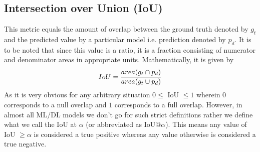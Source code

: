 \subsection{Intersection over Union (IoU)}
This metric equals the amount of overlap between the ground truth
denoted by $g_t$ and the predicted value by a particular model i.e.
prediction denoted by $p_d$. It is to be noted that since this value
is a ratio, it is a fraction consisting of numerator and denominator
areas in appropriate units. Mathematically, it is given by
\begin{equation}
  \centering
  IoU = \frac{area({g_{t}}\cap{ p_{d }})}{area({g_{t}}\cup{ p_{d }})}
\end{equation}
As it is very obvious for any arbitrary situation $0 \leqslant $ IoU
$\leqslant 1$ wherein $0$ corresponds to a null overlap and $1$
corresponds to a full overlap. However, in almost all ML/DL models we
don’t go for such strict definitions rather we define what we call
the IoU at $\alpha$ (or abbreviated as IoU@$\alpha$). This means any
value of IoU $\geqslant \alpha$ is considered a true positive whereas
any value otherwise is considered a true negative. \par


